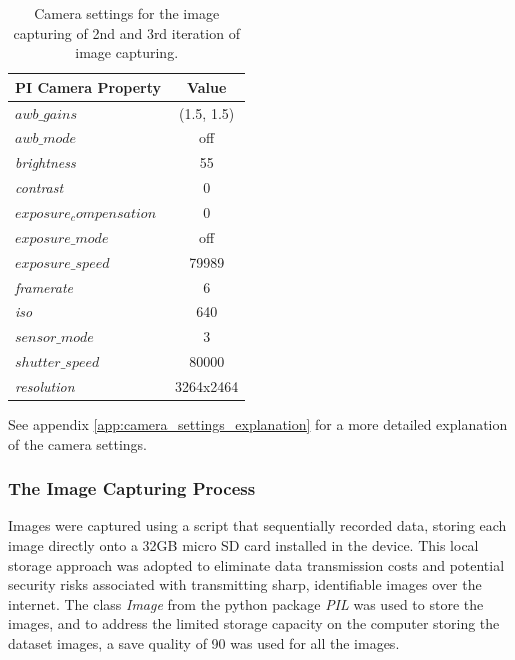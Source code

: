 \begin{table}[H]
    \centering
    \renewcommand{\arraystretch}{1.5} %
    \setlength{\tabcolsep}{1em}
    \begin{tabular}{|l|c|}
        \hline
        \rowcolor{gray!25}
        \textbf{PI Camera Property} & \textbf{Value} \\ \hline
        $awb\_gains$                & (1.5, 1.5)     \\ \hline
        $awb\_mode$                 & off            \\ \hline
        \textit{brightness}         & 55             \\ \hline
        \textit{contrast}           & 0              \\ \hline
        $exposure_compensation$     & 0              \\ \hline
        $exposure\_mode$            & off            \\ \hline
        $exposure\_speed$           & 79989          \\ \hline
        \textit{framerate}          & 6              \\ \hline
        \textit{iso}                & 640            \\ \hline
        $sensor\_mode$              & 3              \\ \hline
        $shutter\_speed$            & 80000          \\ \hline
        \textit{resolution}         & 3264x2464      \\ \hline
    \end{tabular}
    \caption{\centering Camera settings for the image capturing of 2nd and 3rd iteration of image capturing.}
    {See appendix \ref{app:camera_settings_explanation} for a more detailed explanation of the camera settings.}
    \label{tab:picamera_settings}
\end{table}

\subsubsection{The Image Capturing Process}
Images were captured using a script that sequentially recorded data, storing each image directly onto a 32GB micro SD card installed in the device. This local storage approach was adopted to eliminate data transmission costs and potential security risks associated with transmitting sharp, identifiable images over the internet. The class \textit{Image} from the python package \textit{PIL} was used to store the images, and to address the limited storage capacity on the computer storing the dataset images, a save quality of 90 was used for all the images.


